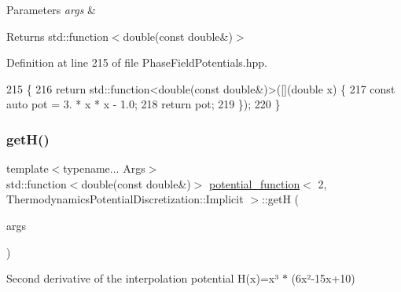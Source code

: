 \begin{DoxyParams}{Parameters}
{\em args} & \\
\hline
\end{DoxyParams}
\begin{DoxyReturn}{Returns}
std\+::function$<$double(const double\&)$>$ 
\end{DoxyReturn}


Definition at line 215 of file Phase\+Field\+Potentials.\+hpp.


\begin{DoxyCode}
215                                                         \{
216     \textcolor{keywordflow}{return} std::function<double(const double&)>([](\textcolor{keywordtype}{double} x) \{
217       \textcolor{keyword}{const} \textcolor{keyword}{auto} pot = 3. * x * x - 1.0;
218       \textcolor{keywordflow}{return} pot;
219     \});
220   \}
\end{DoxyCode}
\mbox{\label{structpotential__function_3_012_00_01ThermodynamicsPotentialDiscretization_1_1Implicit_01_4_a5ff176022201ec370f5b417d4c2fe31a}} 
\subsubsection{\texorpdfstring{get\+H()}{getH()}}
{\footnotesize\ttfamily template$<$typename... Args$>$ \\
std\+::function$<$double(const double\&)$>$ \hyperlink{structpotential__function}{potential\+\_\+function}$<$ 2, Thermodynamics\+Potential\+Discretization\+::\+Implicit $>$\+::getH (\begin{DoxyParamCaption}\item[{Args...}]{args }\end{DoxyParamCaption})\hspace{0.3cm}{\ttfamily [inline]}}



Second derivative of the interpolation potential H(x)=x³ $\ast$ (6x²-\/15x+10) 


